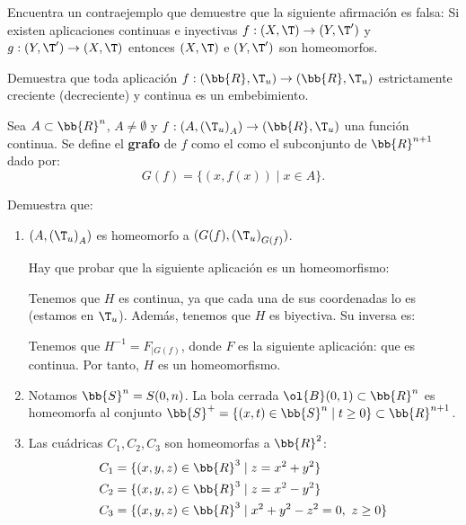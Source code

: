 \begin{ejercicio}
    Encuentra un contraejemplo que demuestre que la siguiente afirmación es falsa: Si existen aplicaciones continuas e inyectivas $f : (X,\T) \to (Y, \T')$ y $g : (Y, \T') \to (X,\T)$ entonces $(X,\T)$ e $(Y, \T')$ son homeomorfos.
\end{ejercicio}

\begin{ejercicio}
    Demuestra que toda aplicación $f : (\bb{R}, \T_u) \to (\bb{R}, \T_u)$ estrictamente creciente (decreciente) y continua es un embebimiento.
\end{ejercicio}


\begin{ejercicio}
    Sea $A \subset \bb{R}^n$, $A\neq \emptyset$ y $f:(A,{(\T_u)}_A) \to (\bb{R}, \T_u)$ una función continua. Se define el \textbf{grafo} de $f$ como el como el subconjunto de $\bb{R}^{n+1}$ dado por:
    \begin{equation*}
        G(f) = \{(x, f(x)) \mid x \in A\} .
    \end{equation*}

    Demuestra que:
    \begin{enumerate}
        \item  ${(A,(\T_u)}_A)$ es homeomorfo a $(G(f),{(\T_u)}_{G(f)})$.

        Hay que probar que la siguiente aplicación es un homeomorfismo:

        Tenemos que $H$ es continua, ya que cada una de sus coordenadas lo es (estamos en $\T_u$). Además, tenemos que $H$ es biyectiva. Su inversa es:

        Tenemos que $H^{-1}=F_{\big| G(f)}$, donde $F$ es la siguiente aplicación:
        que es continua. Por tanto, $H$ es un homeomorfismo.
        
        \item Notamos $\bb{S}^n=S(0,n)$. La bola cerrada $\ol{B}(0, 1) \subset \bb{R}^n$ es homeomorfa al conjunto $\bb{S}^+ = \{(x, t) \in \bb{S}^n \mid t \geq 0\} \subset\bb{R}^{n+1}$.
        \item Las cuádricas $C_1,C_2,C_3$ son homeomorfas a $\bb{R}^2$:
        \begin{equation*}\begin{split}
            C_1 &= \{(x, y, z) \in \bb{R}^3 \mid z = x^2+y^2\}\\
            C_2 &= \{(x, y, z) \in \bb{R}^3 \mid z = x^2-y^2\}\\
            C_3 &= \{(x, y, z) \in \bb{R}^3 \mid x^2 + y^2 - z^2 = 0,~ z \geq 0\}
        \end{split}\end{equation*}
    \end{enumerate}
\end{ejercicio}

